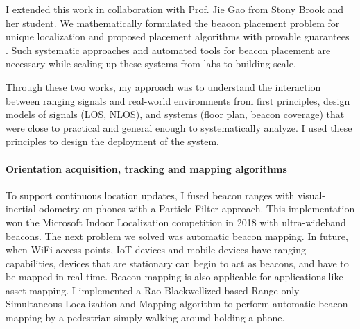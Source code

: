 \documentclass[10pt]{article}
\begin{document}
I extended this work in collaboration with
Prof. Jie Gao from Stony Brook and her student. We mathematically
formulated the beacon placement problem for unique localization and proposed placement
algorithms with provable guarantees \cite{beaconplacementtheory}. Such systematic approaches and automated tools for beacon
placement are necessary while scaling up these systems from labs to
building-scale. 

Through these two works, my approach was to understand the interaction between ranging signals and real-world environments from first principles, design models of signals (LOS, NLOS), and systems (floor plan, beacon coverage) that were close to practical and general enough to systematically analyze. I used these principles to design the deployment of the system. 



\paragraph{Orientation acquisition, tracking and mapping algorithms}


To support continuous location updates, I fused beacon ranges with visual-inertial odometry on phones with a Particle Filter approach. This implementation won the Microsoft Indoor Localization competition in 2018 with ultra-wideband beacons. The next problem we solved was automatic beacon mapping. In future, when WiFi access points, IoT devices and mobile devices have ranging capabilities, devices that are stationary can begin to act as beacons, and have to be mapped in real-time. Beacon mapping is also applicable for applications like asset mapping. I implemented a Rao Blackwellized-based Range-only Simultaneous Localization and Mapping algorithm to perform automatic beacon mapping by a pedestrian simply walking around holding a phone. 
\end{document}
